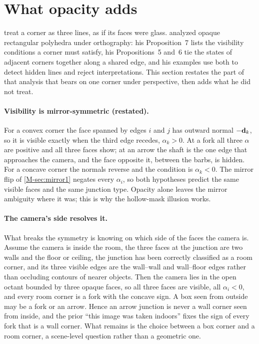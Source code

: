 
\section{What opacity adds}\label{sec:opacity}

 treat a corner as three lines, as if its faces were glass. \citet{kanatani1986} analyzed opaque rectangular polyhedra under orthography: his Proposition~7 lists the visibility conditions a corner must satisfy, his Propositions~5 and~6 tie the states of adjacent corners together along a shared edge, and his examples use both to detect hidden lines and reject interpretations. This section restates the part of that analysis that bears on one corner under perspective, then adds what he did not treat.

\paragraph{Visibility is mirror-symmetric (restated).} For a convex corner the face spanned by edges $i$ and $j$ has outward normal $-\mathbf{d}_k$, so it is visible exactly when the third edge recedes, $\alpha_k>0$. At a fork all three $\alpha$ are positive and all three faces show; at an arrow the shaft is the one edge that approaches the camera, and the face opposite it, between the barbs, is hidden. For a concave corner the normals reverse and the condition is $\alpha_k<0$. The mirror flip of \cref{M-sec:mirror1} negates every $\alpha_i$, so both hypotheses predict the same visible faces and the same junction type. Opacity alone leaves the mirror ambiguity where it was; this is why the hollow-mask illusion works.

\paragraph{The camera's side resolves it.} What breaks the symmetry is knowing on which side of the faces the camera is. Assume the camera is inside the room, the three faces at the junction are two walls and the floor or ceiling, the junction has been correctly classified as a room corner, and its three visible edges are the wall--wall and wall--floor edges rather than occluding contours of nearer objects. Then the camera lies in the open octant bounded by three opaque faces, so all three faces are visible, all $\alpha_i<0$, and every room corner is a fork with the concave sign. A box seen from outside may be a fork or an arrow. Hence an arrow junction is never a wall corner seen from inside, and the prior ``this image was taken indoors'' fixes the sign of every fork that is a wall corner. What remains is the choice between a box corner and a room corner, a scene-level question rather than a geometric one.

